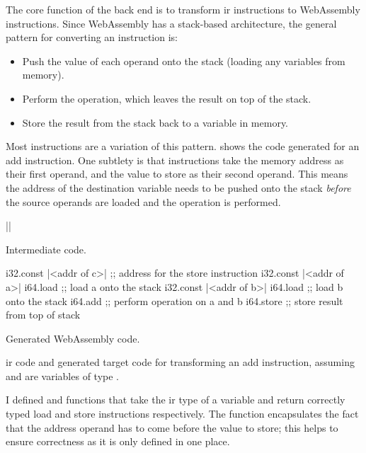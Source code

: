 \documentclass[00-main.tex]{subfiles}
\begin{document}
The core function of the back end is to transform \gls{ir} instructions to WebAssembly instructions.
Since WebAssembly has a stack-based architecture, the general pattern for converting an instruction is:
\begin{itemize}[nosep]
\item Push the value of each operand onto the stack (loading any variables from memory).
\item Perform the operation, which leaves the result on top of the stack.
\item Store the result from the stack back to a variable in memory.
\end{itemize}
Most instructions are a variation of this pattern.
 shows the code generated for an add instruction.
One subtlety is that  instructions take the memory address as their first operand, and the value to store as their second operand.
This means the address of the destination variable needs to be pushed onto the stack \emph{before} the source operands are loaded and the operation is performed.

\begin{listing}[t]
  \begin{sublisting}[b]{0.28\textwidth}
    \begin{TextListing}
      ||
    \end{TextListing}
    \caption{Intermediate code.}
  \end{sublisting}
  \hfill
  \begin{sublisting}[b]{0.7\textwidth}
    \begin{WasmListing}
      i32.const |<addr of c>|  ;; address for the store instruction
      i32.const |<addr of a>|
      i64.load               ;; load a onto the stack
      i32.const |<addr of b>|
      i64.load               ;; load b onto the stack
      i64.add                ;; perform operation on a and b
      i64.store              ;; store result from top of stack
    \end{WasmListing}
    \caption{Generated WebAssembly code.}
  \end{sublisting}
  \caption{\Gls{ir} code and generated target code for transforming an add instruction, assuming  and  are variables of type .}
  \label{lst:converting add instr to wasm code}
\end{listing}

I defined  and  functions that take the \gls{ir} type of a variable and return correctly typed load and store instructions respectively.
The  function encapsulates the fact that the address operand has to come before the value to store; this helps to ensure correctness as it is only defined in one place.
\end{document}
